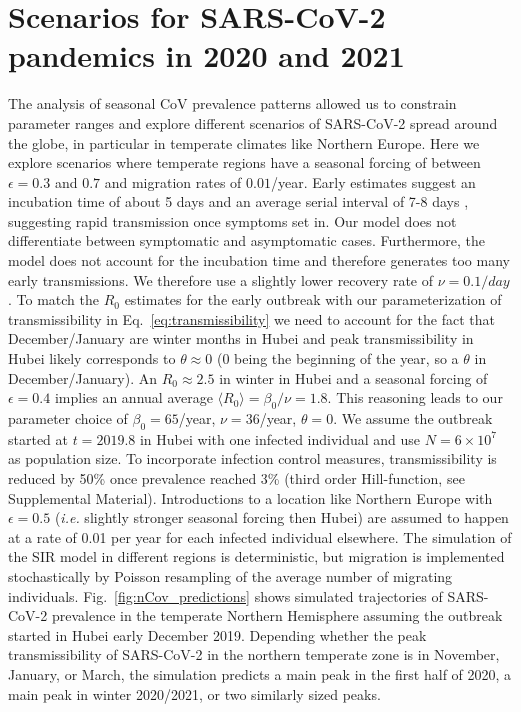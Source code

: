 \documentclass[rmp, reprint, superscriptaddress, floatfix,amsmath]{revtex4-1}
\begin{document}
\section{Scenarios for SARS-CoV-2 pandemics in 2020 and 2021}
\label{section:sars_pandemic_regional}
The analysis of seasonal CoV prevalence patterns allowed us to constrain parameter ranges and explore different scenarios of SARS-CoV-2 spread around the globe, in particular in temperate climates like Northern Europe. 
Here we explore scenarios where temperate regions have a seasonal forcing of between $\epsilon=0.3$ and $0.7$ and migration rates of $0.01$/year. 
Early estimates suggest an incubation time of about 5 days \citep{backer_incubation_2020} and an average serial interval of 7-8 days \citep{wu_nowcasting_2020}, suggesting rapid transmission once symptoms set in. 
Our model does not differentiate between symptomatic and asymptomatic cases. 
Furthermore, the model does not account for the incubation time and therefore generates too many early transmissions. 
We therefore use a slightly lower recovery rate of $\nu = 0.1/day$. 
To match the $R_0$ estimates for the early outbreak with our parameterization of transmissibility in Eq.~\ref{eq:transmissibility} we need to account for the fact that December/January are winter months in Hubei and peak transmissibility in Hubei likely corresponds to $\theta\approx 0$ (0 being the beginning of the year, so a $\theta$ in December/January). An $R_0\approx 2.5$ in winter in Hubei and a seasonal forcing of $\epsilon=0.4$ implies an annual average $\langle R_0\rangle = \beta_0/\nu=1.8$.
This reasoning leads to our parameter choice of $\beta_0=65$/year, $\nu=36$/year, $\theta=0$. 
We assume the outbreak started at $t=2019.8$ in Hubei with one infected individual and use $N=6\times 10^{7}$ as population size.
To incorporate infection control measures, transmissibility is reduced by 50\% once prevalence reached 3\% (third order Hill-function, see Supplemental Material).
Introductions to a location like Northern Europe with $\epsilon=0.5$ (\textit{i.e.} slightly stronger seasonal forcing then Hubei) are assumed to happen at a rate of 0.01 per year for each infected individual elsewhere.
The simulation of the SIR model in different regions is deterministic, but migration is implemented stochastically by Poisson resampling of the average number of migrating individuals. 
Fig.~\ref{fig:nCov_predictions} shows simulated trajectories of SARS-CoV-2 prevalence in the temperate Northern Hemisphere assuming the outbreak started in Hubei early December 2019.
Depending whether the peak transmissibility of SARS-CoV-2 in the northern temperate zone is in November, January, or March, the simulation predicts a main peak in the first half of 2020, a main peak in winter 2020/2021, or two similarly sized peaks.
\end{document}
